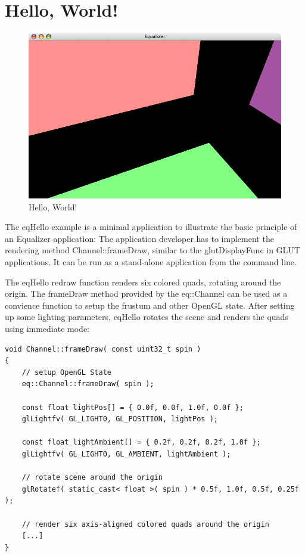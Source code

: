 \documentclass[10pt,a4]{scrartcl}
\begin{document}
\section{Hello, World!}

\begin{figure}
  \includegraphics[width=.618\textwidth]{images/eqHello.png}
  {\caption{\small\label{fHello}Hello, World!}}
\end{figure}
The \textsf{eqHello} example is a minimal application to illustrate the
basic principle of an Equalizer application: The application developer
has to implement the rendering method \textsf{Channel::frameDraw},
similar to the \textsf{glutDisplayFunc} in GLUT applications. It can be
run as a stand-alone application from the command line.

The \textsf{eqHello} redraw function renders six colored quads, rotating
around the origin. The \textsf{frameDraw} meth\-od provided by the
\textsf{eq::Channel} can be used as a convience function to setup the
frustum and other OpenGL state. After setting up some lighting
parameters, \textsf{eqHello} rotates the scene and renders the quads
using immediate mode:

{\footnotesize\begin{lstlisting}
void Channel::frameDraw( const uint32_t spin )
{
    // setup OpenGL State
    eq::Channel::frameDraw( spin );
    
    const float lightPos[] = { 0.0f, 0.0f, 1.0f, 0.0f };
    glLightfv( GL_LIGHT0, GL_POSITION, lightPos );

    const float lightAmbient[] = { 0.2f, 0.2f, 0.2f, 1.0f };
    glLightfv( GL_LIGHT0, GL_AMBIENT, lightAmbient );

    // rotate scene around the origin
    glRotatef( static_cast< float >( spin ) * 0.5f, 1.0f, 0.5f, 0.25f );

    // render six axis-aligned colored quads around the origin
    [...]
}
\end{lstlisting}}
\end{document}
